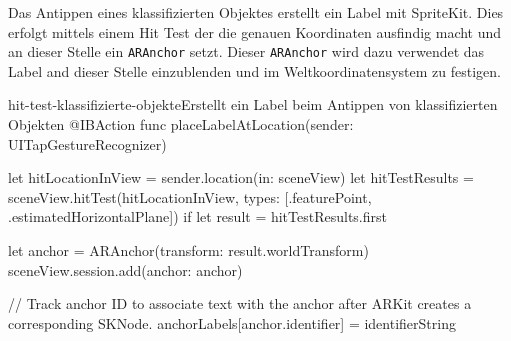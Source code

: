 \begin{description}
	Das Antippen eines klassifizierten Objektes erstellt ein Label mit SpriteKit. Dies erfolgt mittels einem Hit Test der die genauen Koordinaten ausfindig macht und an dieser Stelle ein \texttt{ARAnchor} setzt. Dieser \texttt{ARAnchor} wird dazu verwendet das Label and dieser Stelle einzublenden und im Weltkoordinatensystem zu festigen.
	\begin{code}{hit-test-klassifizierte-objekte}{Erstellt ein Label beim Antippen von klassifizierten Objekten}
	@IBAction func placeLabelAtLocation(sender: UITapGestureRecognizer) {
		let hitLocationInView = sender.location(in: sceneView)
		let hitTestResults = sceneView.hitTest(hitLocationInView, types: [.featurePoint, .estimatedHorizontalPlane])
		if let result = hitTestResults.first {
			
			let anchor = ARAnchor(transform: result.worldTransform)
			sceneView.session.add(anchor: anchor)
			
			// Track anchor ID to associate text with the anchor after ARKit creates a corresponding SKNode.
			anchorLabels[anchor.identifier] = identifierString
		}
	}
	\end{code}

\end{description}
